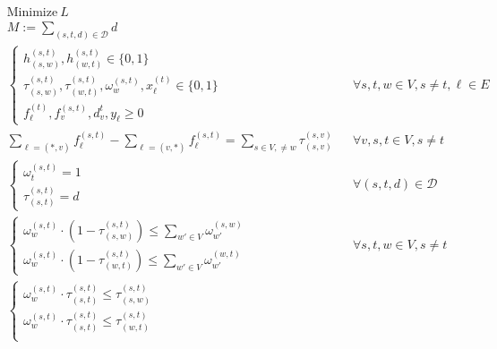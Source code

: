 \documentclass[a4paper,USenglish]{lipics-v2018}
\begin{document}
\begin{align}
& \text{Minimize} ~L \nonumber	&&\\
&M := \sum_{ (s,t,d) \in \mathcal{D}} d &&\\
&\begin{cases}
	h^{(s,t)}_{(s,w)}, h^{(s,t)}_{(w,t)}  \in \{0,1\} \\
	\tau^{(s,t)}_{(s,w)}, \tau^{(s,t)}_{(w,t)},
	\omega^{(s,t)}_{w},
	x^{(t)}_{\ell} 
 \in \{0,1\} \\
 f^{(t)}_{\ell}, f^{(s,t)}_{v}, d^{t}_v, y_{\ell}  \geq 0
\end{cases}
&&\forall  s,t,w \in V, s \neq t, \ell \in E \label{LP:vardef}    
\\
&\sum_{\ell = (*,v)} f^{(s,t)}_{\ell} - 
\sum_{\ell= (v,*)}f^{(s,t)}_{\ell}
= \sum_{ s\in V,\neq w} \tau^{(s,v)}_{(s,v)}
&& \forall v,s,t \in V, s \neq t
\label{LP:flowcons}
 \\
 & 
 \begin{cases}
	 \omega^{(s,t)}_{t} = 1 \\
	 \tau^{(s,t)}_{(s,t)} = d
 \end{cases}
 && \forall (s,t,d) \in \mathcal{D}
 \label{LP:wp_t}
 \\
 &
 \begin{cases*}
    \omega^{(s,t)}_{w} \cdot (1-\tau^{(s,t)}_{(s,w)}) \leq  \sum_{w' \in V} \omega^{(s,w)}_{w'}	\\
    \omega^{(s,t)}_{w} \cdot (1-\tau^{(s,t)}_{(w,t)})  \leq  \sum_{w' \in V} \omega^{(w,t)}_{w'}	    
 \end{cases*}	 
 && \forall s,t,w \in V, s\neq t
 \label{LP:segments}
  \\
 &
 \begin{cases*}
  \omega^{(s,t)}_{w} \cdot \tau^{(s,t)}_{(s,t)} \leq \tau^{(s,t)}_{(s,w)}	\\
 \omega^{(s,t)}_{w}  \cdot \tau^{(s,t)}_{(s,t)} \leq  \tau^{(s,t)}_{(w,t)}\\

\end{cases*}
\end{align}
\end{document}
